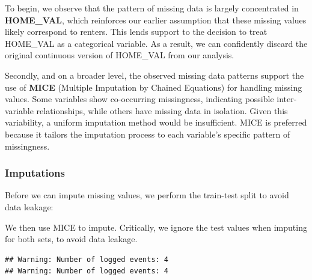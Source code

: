 \documentclass[
]{article}
\begin{document}
To begin, we observe that the pattern of missing data is largely
concentrated in \textbf{HOME\_VAL}, which reinforces our earlier
assumption that these missing values likely correspond to renters. This
lends support to the decision to treat HOME\_VAL as a categorical
variable. As a result, we can confidently discard the original
continuous version of HOME\_VAL from our analysis.

Secondly, and on a broader level, the observed missing data patterns
support the use of \textbf{MICE} (Multiple Imputation by Chained
Equations) for handling missing values. Some variables show co-occurring
missingness, indicating possible inter-variable relationships, while
others have missing data in isolation. Given this variability, a uniform
imputation method would be insufficient. MICE is preferred because it
tailors the imputation process to each variable's specific pattern of
missingness.

\subsubsection{Imputations}\label{imputations}

Before we can impute missing values, we perform the train-test split to
avoid data leakage:

We then use MICE to impute. Critically, we ignore the test values when
imputing for both sets, to avoid data leakage.

\begin{verbatim}
## Warning: Number of logged events: 4
## Warning: Number of logged events: 4
\end{verbatim}
\end{document}
